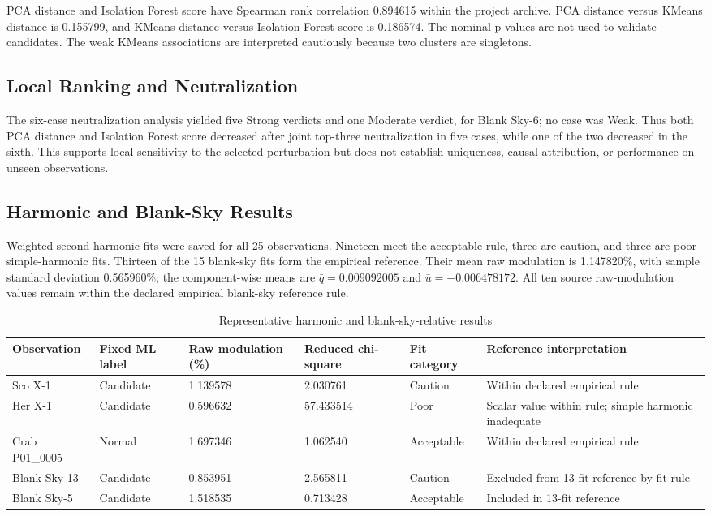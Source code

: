 \documentclass[conference]{IEEEtran}
\begin{document}
PCA distance and Isolation Forest score have Spearman rank correlation 0.894615 within the project archive. PCA distance versus KMeans distance is 0.155799, and KMeans distance versus Isolation Forest score is 0.186574. The nominal p-values are not used to validate candidates. The weak KMeans associations are interpreted cautiously because two clusters are singletons.


\subsection{Local Ranking and Neutralization}

The six-case neutralization analysis yielded five Strong verdicts and one Moderate verdict, for Blank Sky-6; no case was Weak. Thus both PCA distance and Isolation Forest score decreased after joint top-three neutralization in five cases, while one of the two decreased in the sixth. This supports local sensitivity to the selected perturbation but does not establish uniqueness, causal attribution, or performance on unseen observations.


\subsection{Harmonic and Blank-Sky Results}

Weighted second-harmonic fits were saved for all 25 observations. Nineteen meet the acceptable rule, three are caution, and three are poor simple-harmonic fits. Thirteen of the 15 blank-sky fits form the empirical reference. Their mean raw modulation is 1.147820\%, with sample standard deviation 0.565960\%; the component-wise means are $\bar q=0.009092005$ and $\bar u=-0.006478172$. All ten source raw-modulation values remain within the declared empirical blank-sky reference rule.


\begin{table}[t]
\centering
\caption{Representative harmonic and blank-sky-relative results}
\label{tab:4}
\footnotesize
\begin{tabular}{@{}p{}p{}p{}p{}p{}p{}@{}}
\toprule
Observation & Fixed ML label & Raw modulation (\%) & Reduced chi-square & Fit category & Reference interpretation \\
\midrule
Sco X-1 & Candidate & 1.139578 & 2.030761 & Caution & Within declared empirical rule \\
Her X-1 & Candidate & 0.596632 & 57.433514 & Poor & Scalar value within rule; simple harmonic inadequate \\
Crab P01\_0005 & Normal & 1.697346 & 1.062540 & Acceptable & Within declared empirical rule \\
Blank Sky-13 & Candidate & 0.853951 & 2.565811 & Caution & Excluded from 13-fit reference by fit rule \\
Blank Sky-5 & Candidate & 1.518535 & 0.713428 & Acceptable & Included in 13-fit reference \\
\bottomrule
\end{tabular}
\end{table}
\end{document}
